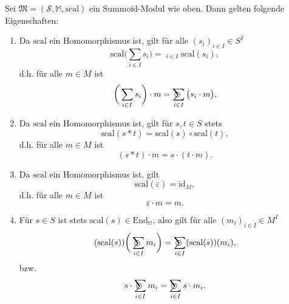 \documentclass{article}
\DeclareMathOperator*{\sumcirc}{%
  \ThisStyle{\mathop{\ensurestackMath{\stackinset{c}{-1.5\LMpt}{c}{}{%
  \rotatebox[origin=lb]{-90}{$\SavedStyle\scalerel*{\bm\Circle}{%
  i}$}}{\SavedStyle\sum}}}}}
\DeclareMathOperator*{\sumbar}{\overline{\sum}}
\begin{document}
\begin{remark}
  Sei $\mathfrak{M} = (\mathcal{S}, \mathbb{M}, \text{scal})$ ein Summoid-Modul wie oben.
  Dann gelten folgende Eigenschaften:
  \begin{enumerate}
    \item Da $\text{scal}$ ein Homomorphismus ist, gilt für alle $(s_i)_{i \in I} \in S^I$
          \begin{equation*}
            \text{scal}\bigg(\sum_{i \in I}s_i\bigg) = \sumbar_{i \in I} \text{scal}(s_i),
          \end{equation*}
          d.h. für alle $m \in M$ ist
          \begin{equation*}
            \bigg(\sum_{i \in I}s_i\bigg) \cdot m = \sumcirc_{i \in I} \big(s_i \cdot m\big),
          \end{equation*}
    \item Da $\text{scal}$ ein Homomorphismus ist, gilt für $s, t \in S$ stets
          \begin{equation*}
            \text{scal}(s \ast t) = \text{scal}(s) \circ \text{scal}(t),
          \end{equation*}
          d.h. für alle $m \in M$ ist
          \begin{equation*}
            (s \ast t) \cdot m = s \cdot (t \cdot m).
          \end{equation*}
    \item Da $\text{scal}$ ein Homomorphismus ist, gilt
          \begin{equation*}
            \text{scal}(\varepsilon) = \text{id}_M,
          \end{equation*}
          d.h. für alle $m \in M$ ist
          \begin{equation*}
            \varepsilon \cdot m = m.
          \end{equation*}
    \item Für $s \in S$ ist stets $\text{scal}(s) \in \text{End}_\mathbb{M}$,
          also gilt für alle $(m_i)_{i \in I} \in M^I$
          \begin{equation*}
            (\text{scal}(s))\bigg(\sumcirc_{i \in I} m_i\bigg) = \sumcirc_{i \in I}(\text{scal}(s))(m_i),
          \end{equation*}
          bzw.
          \begin{equation*}
            s \cdot \sumcirc_{i \in I}m_i = \sumcirc_{i \in I}s \cdot m_i.
          \end{equation*}
  \end{enumerate}
\end{remark}
\end{document}
